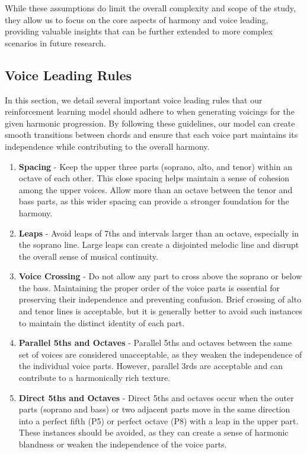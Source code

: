 \documentclass[12pt, letterpaper]{article}
\begin{document}
While these assumptions do limit the overall complexity and scope of the study, they allow us to focus on the core aspects of harmony and voice leading, providing valuable insights that can be further extended to more complex scenarios in future research.

\subsection{Voice Leading Rules}\label{subsection_voice_leading_rules}

In this section, we detail several important voice leading rules that our reinforcement learning model should adhere to when generating voicings for the given harmonic progression. By following these guidelines, our model can create smooth transitions between chords and ensure that each voice part maintains its independence while contributing to the overall harmony.

\begin{enumerate}
    \item \textbf{Spacing} - Keep the upper three parts (soprano, alto, and tenor) within an octave of each other. This close spacing helps maintain a sense of cohesion among the upper voices. Allow more than an octave between the tenor and bass parts, as this wider spacing can provide a stronger foundation for the harmony.
    \item \textbf{Leaps} - Avoid leaps of 7ths and intervals larger than an octave, especially in the soprano line. Large leaps can create a disjointed melodic line and disrupt the overall sense of musical continuity.
    \item \textbf{Voice Crossing} - Do not allow any part to cross above the soprano or below the bass. Maintaining the proper order of the voice parts is essential for preserving their independence and preventing confusion. Brief crossing of alto and tenor lines is acceptable, but it is generally better to avoid such instances to maintain the distinct identity of each part.
    \item \textbf{Parallel 5ths and Octaves} - Parallel 5ths and octaves between the same set of voices are considered unacceptable, as they weaken the independence of the individual voice parts. However, parallel 3rds are acceptable and can contribute to a harmonically rich texture.
    \item \textbf{Direct 5ths and Octaves} - Direct 5ths and octaves occur when the outer parts (soprano and bass) or two adjacent parts move in the same direction into a perfect fifth (P5) or perfect octave (P8) with a leap in the upper part. These instances should be avoided, as they can create a sense of harmonic blandness or weaken the independence of the voice parts.
\end{enumerate}
\end{document}
